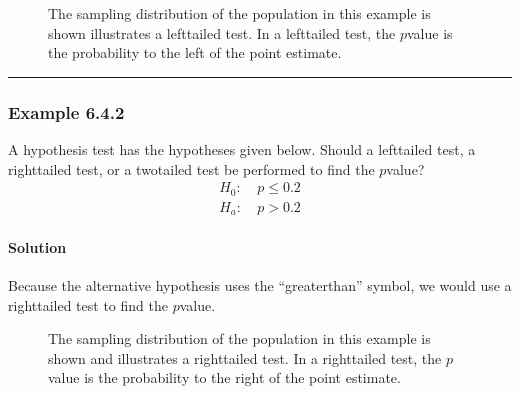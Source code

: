 \documentclass[letterpaper,10pt,english]{jupyterBook}
\begin{document}
\begin{figure}[htbp]
\centering
\capstart

\noindent{}
\caption{The sampling distribution of the population in this example is shown illustrates a left\sphinxhyphen{}tailed test. In a left\sphinxhyphen{}tailed test, the \(p\)\sphinxhyphen{}value is the probability to the left of the point estimate.}\label{\detokenize{Ch6 An Introduction to Hypothesis Testing/6.4 Hypothesis Tests of One Population:left-tailed}}\end{figure}


\bigskip\hrule\bigskip



\subsubsection{Example 6.4.2}
\label{\detokenize{Ch6 An Introduction to Hypothesis Testing/6.4 Hypothesis Tests of One Population:example-6-4-2}}
\sphinxAtStartPar
A hypothesis test has the hypotheses given below. Should a left\sphinxhyphen{}tailed test, a right\sphinxhyphen{}tailed test, or a two\sphinxhyphen{}tailed test be performed to find the \(p\)\sphinxhyphen{}value?
\begin{align*}
H_0:&\ p \leq 0.2 \\
H_a:&\ p > 0.2
\end{align*}

\paragraph{Solution}
\label{\detokenize{Ch6 An Introduction to Hypothesis Testing/6.4 Hypothesis Tests of One Population:id1}}
\sphinxAtStartPar
Because the alternative hypothesis uses the “greater\sphinxhyphen{}than” symbol, we would use a right\sphinxhyphen{}tailed test to find the \(p\)\sphinxhyphen{}value.

\begin{figure}[htbp]
\centering
\capstart

\noindent{}
\caption{The sampling distribution of the population in this example is shown and illustrates a right\sphinxhyphen{}tailed test. In a right\sphinxhyphen{}tailed test, the \(p\)\sphinxhyphen{}value is the probability to the right of the point estimate.}\label{\detokenize{Ch6 An Introduction to Hypothesis Testing/6.4 Hypothesis Tests of One Population:right-tailed}}\end{figure}
\end{document}
